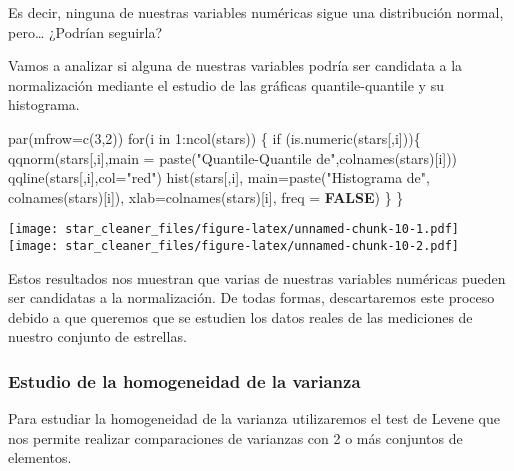 \documentclass[
]{article}
\newenvironment{Shaded}{\begin{snugshade}}{\end{snugshade}}
\newcommand{\AttributeTok}[1]{\textcolor[rgb]{0.80,0.80,0.80}{#1}}
\newcommand{\ConstantTok}[1]{\textcolor[rgb]{0.86,0.64,0.64}{\textbf{#1}}}
\newcommand{\ControlFlowTok}[1]{\textcolor[rgb]{0.94,0.87,0.69}{#1}}
\newcommand{\DecValTok}[1]{\textcolor[rgb]{0.86,0.86,0.80}{#1}}
\newcommand{\FunctionTok}[1]{\textcolor[rgb]{0.94,0.94,0.56}{#1}}
\newcommand{\NormalTok}[1]{\textcolor[rgb]{0.80,0.80,0.80}{#1}}
\newcommand{\SpecialCharTok}[1]{\textcolor[rgb]{0.86,0.64,0.64}{#1}}
\newcommand{\StringTok}[1]{\textcolor[rgb]{0.80,0.58,0.58}{#1}}
\begin{document}
Es decir, ninguna de nuestras variables numéricas sigue una distribución
normal, pero\ldots{} ¿Podrían seguirla?

Vamos a analizar si alguna de nuestras variables podría ser candidata a
la normalización mediante el estudio de las gráficas quantile-quantile y
su histograma.

\begin{Shaded}
\begin{Highlighting}[]
\FunctionTok{par}\NormalTok{(}\AttributeTok{mfrow=}\FunctionTok{c}\NormalTok{(}\DecValTok{3}\NormalTok{,}\DecValTok{2}\NormalTok{))}
\ControlFlowTok{for}\NormalTok{(i }\ControlFlowTok{in} \DecValTok{1}\SpecialCharTok{:}\FunctionTok{ncol}\NormalTok{(stars)) \{}
  \ControlFlowTok{if}\NormalTok{ (}\FunctionTok{is.numeric}\NormalTok{(stars[,i]))\{}
    \FunctionTok{qqnorm}\NormalTok{(stars[,i],}\AttributeTok{main =} \FunctionTok{paste}\NormalTok{(}\StringTok{"Quantile{-}Quantile de"}\NormalTok{,}\FunctionTok{colnames}\NormalTok{(stars)[i]))}
    \FunctionTok{qqline}\NormalTok{(stars[,i],}\AttributeTok{col=}\StringTok{"red"}\NormalTok{)}
    \FunctionTok{hist}\NormalTok{(stars[,i], }
      \AttributeTok{main=}\FunctionTok{paste}\NormalTok{(}\StringTok{"Histograma de"}\NormalTok{, }\FunctionTok{colnames}\NormalTok{(stars)[i]), }
      \AttributeTok{xlab=}\FunctionTok{colnames}\NormalTok{(stars)[i], }\AttributeTok{freq =} \ConstantTok{FALSE}\NormalTok{)}
\NormalTok{  \}}
\NormalTok{\}}
\end{Highlighting}
\end{Shaded}

\texttt{[image: star\_cleaner\_files/figure-latex/unnamed-chunk-10-1.pdf]}
\texttt{[image: star\_cleaner\_files/figure-latex/unnamed-chunk-10-2.pdf]}

Estos resultados nos muestran que varias de nuestras variables numéricas
pueden ser candidatas a la normalización. De todas formas, descartaremos
este proceso debido a que queremos que se estudien los datos reales de
las mediciones de nuestro conjunto de estrellas.

\hypertarget{estudio-de-la-homogeneidad-de-la-varianza}{%
\subsubsection{Estudio de la homogeneidad de la
varianza}\label{estudio-de-la-homogeneidad-de-la-varianza}}

Para estudiar la homogeneidad de la varianza utilizaremos el test de
Levene que nos permite realizar comparaciones de varianzas con 2 o más
conjuntos de elementos.
\end{document}
